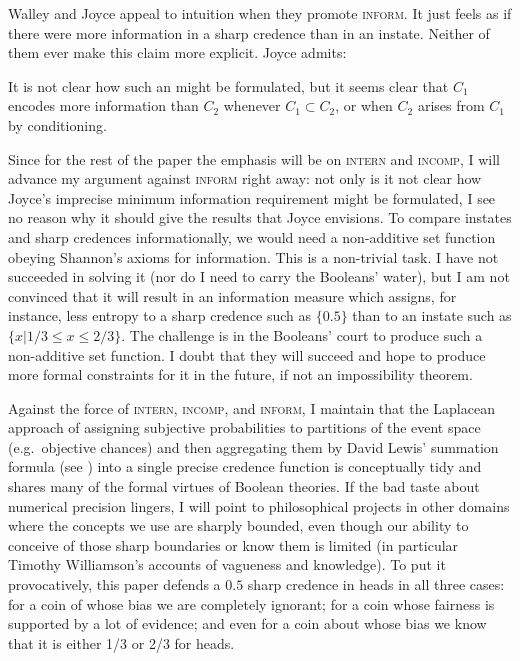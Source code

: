 \documentclass[12pt]{article}
\begin{document}
Walley and Joyce appeal to intuition when they promote
\textsc{inform}. It just feels as if there were more information in a
sharp credence than in an instate. Neither of them ever make this
claim more explicit. Joyce admits:

\begin{quotex}
  It is not clear how such an  might be formulated, but it seems clear that $C_{1}$
  encodes more information than $C_{2}$ whenever
  $C_{1}\subset{}C_{2}$, or when $C_{2}$ arises from $C_{1}$ by
  conditioning. 
\end{quotex}

Since for the rest of the paper the emphasis will be on
\textsc{intern} and \textsc{incomp}, I will advance my argument
against \textsc{inform} right away: not only is it not clear how
Joyce's imprecise minimum information requirement might be formulated,
I see no reason why it should give the results that Joyce envisions.
To compare instates and sharp credences informationally, we would need
a non-additive set function obeying Shannon's axioms for information.
This is a non-trivial task. I have not succeeded in solving it (nor do
I need to carry the Booleans' water), but I am not convinced that it
will result in an information measure which assigns, for instance,
less entropy to a sharp credence such as $\{0.5\}$ than to an instate
such as $\{x|1/3\leq{}x\leq{}2/3\}$. The challenge is in the Booleans'
court to produce such a non-additive set function. I doubt that they
will succeed and hope to produce more formal constraints for it in the
future, if not an impossibility theorem.

Against the force of \textsc{intern}, \textsc{incomp}, and
\textsc{inform}, I maintain that the Laplacean approach of assigning
subjective probabilities to partitions of the event space (e.g.\
objective chances) and then aggregating them by David Lewis' summation
formula (see \scite{8}{lewis81}{266f}) into a single precise credence
function is conceptually tidy and shares many of the formal virtues of
Boolean theories. If the bad taste about numerical precision lingers,
I will point to philosophical projects in other domains where the
concepts we use are sharply bounded, even though our ability to
conceive of those sharp boundaries or know them is limited (in
particular Timothy Williamson's accounts of vagueness and knowledge).
To put it provocatively, this paper defends a $0.5$ sharp credence in
heads in all three cases: for a coin of whose bias we are completely
ignorant; for a coin whose fairness is supported by a lot of evidence;
and even for a coin about whose bias we know that it is either 1/3 or
2/3 for heads.
\end{document}
